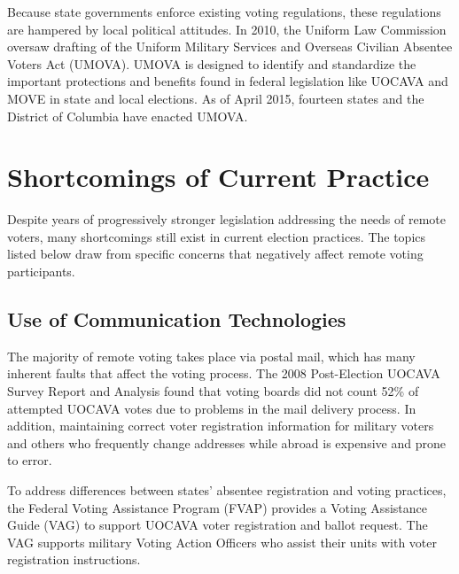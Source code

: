 Because state governments enforce existing voting regulations, these
regulations are hampered by local political attitudes. In 2010, the
Uniform Law Commission oversaw drafting of the Uniform Military
Services and Overseas Civilian Absentee Voters Act (UMOVA). UMOVA is
designed to identify and standardize the important protections and
benefits found in federal legislation like UOCAVA and MOVE in state
and local elections. As of April 2015, fourteen states and the
District of Columbia have enacted UMOVA.

\section{Shortcomings of Current Practice}

Despite years of progressively stronger legislation addressing the
needs of remote voters, many shortcomings still exist in current
election practices. The topics listed below draw from specific
concerns that negatively affect remote voting participants.

\subsection{Use of Communication Technologies}
The majority of remote voting takes place via postal mail, which has
many inherent faults that affect the voting process. The 2008
Post-Election UOCAVA Survey Report and Analysis found that voting
boards did not count 52\% of attempted UOCAVA votes due to problems in
the mail delivery process. In addition, maintaining correct voter
registration information for military voters and others who frequently
change addresses while abroad is expensive and prone to error.



To address differences between states' absentee registration and
voting practices, the Federal Voting Assistance Program (FVAP)
provides a Voting Assistance Guide (VAG) to support UOCAVA voter
registration and ballot request. The VAG supports military Voting
Action Officers who assist their units with voter registration
instructions. 

